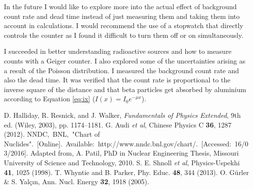 \documentclass[twocolumn]{revtex4-1}
\begin{document}
In the future I would like to explore more into the actual effect of background count rate and dead time instead of just measuring them and taking them into account in calculations.
I would recommend the use of a stopwatch that directly controls the counter as I found it difficult to turn them off or on simultaneously.

I succeeded in better understanding radioactive sources and how to measure counts with a Geiger counter.
I also explored some of the uncertainties arising as a result of the Poisson distribution.
I measured the background count rate and also the dead time.
It was verified that the count rate is proportional to the inverse square of the distance and that beta particles get absorbed by aluminium according to Equation \ref{eq:ix} ($I(x)=I_{0}e^{-\mu x}$).

\begin{thebibliography}{99}

 D. Halliday, R. Resnick, and J. Walker, {\it Fundamentals of Physics Extended}, 9th ed. (Wiley, 2003), pp. 1174--1181.
 G. Audi {\it et al}, Chinese Physics C {\bf 36}, 1287 (2012).
 NNDC,\ BNL,\ "Chart of Nuclides".\ [Online].\ Available:\ http://www.nndc.bnl.gov/chart/.\ [Accessed:\ 16/03/2016].
 Adapted from, A. Patil, PhD in Nuclear Engineering Thesis, Missouri University of Science and Technology, 2010.
 S. E. Shnoll {\it et al}, Physics-Uspekhi {\bf 41}, 1025 (1998).
 T. Whyntie and B. Parker, Phy. Educ. {\bf 48}, 344 (2013).
 O. G\"{u}rler \& S. Yal\c{c}\i{}n, Ann. Nucl. Energy {\bf 32}, 1918 (2005).

\end{thebibliography} 
\end{document}
